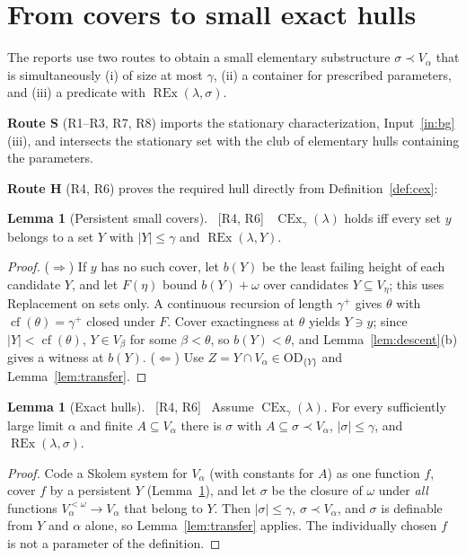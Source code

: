 \documentclass[11pt,letterpaper]{article}
\theoremstyle{definition}
\newtheorem{lemma}[definition]{Lemma}
\numberwithin{equation}{section}
\newcommand{\OD}{\mathrm{OD}}
\newcommand{\CEx}{\operatorname{CEx}}
\newcommand{\REx}{\operatorname{REx}}
\newcommand{\cf}{\operatorname{cf}}
\newcommand{\src}[1]{\unskip\ {\normalfont\small\sffamily\color{Olive}[#1]}\ }
\newcommand{\R}[1]{\textsf{R#1}}
\begin{document}
\section{From covers to small exact hulls}\label{sec:hulls}

The reports use two routes to obtain a small elementary substructure $\sigma\prec V_\alpha$ that is simultaneously (i) of size at most $\gamma$, (ii) a container for prescribed parameters, and (iii) a predicate with $\REx(\lambda,\sigma)$.

\textbf{Route S} (\R1--\R3, \R7, \R8) imports the stationary characterization, Input~\ref{in:bg}(iii), and intersects the stationary set with the club of elementary hulls containing the parameters.

\textbf{Route H} (\R4, \R6) proves the required hull directly from Definition~\ref{def:cex}:

\begin{lemma}[Persistent small covers]\label{lem:persist}\src{R4, R6}
$\CEx_\gamma(\lambda)$ holds iff every set $y$ belongs to a set $Y$ with $|Y|\le\gamma$ and $\REx(\lambda,Y)$.
\end{lemma}

\begin{proof}
($\Rightarrow$) If $y$ has no such cover, let $b(Y)$ be the least failing height of each candidate $Y$, and let $F(\eta)$ bound $b(Y)+\omega$ over candidates $Y\subseteq V_\eta$; this uses Replacement on sets only. A continuous recursion of length $\gamma^+$ gives $\theta$ with $\cf(\theta)=\gamma^+$ closed under $F$. Cover exactingness at $\theta$ yields $Y\ni y$; since $|Y|<\cf(\theta)$, $Y\in V_\beta$ for some $\beta<\theta$, so $b(Y)<\theta$, and Lemma~\ref{lem:descent}(b) gives a witness at $b(Y)$. ($\Leftarrow$) Use $Z=Y\cap V_\alpha\in\OD_{\{Y\}}$ and Lemma~\ref{lem:transfer}.
\end{proof}

\begin{lemma}[Exact hulls]\label{lem:hull}\src{R4, R6}
Assume $\CEx_\gamma(\lambda)$. For every sufficiently large limit $\alpha$ and finite $A\subseteq V_\alpha$ there is $\sigma$ with $A\subseteq\sigma\prec V_\alpha$, $|\sigma|\le\gamma$, and $\REx(\lambda,\sigma)$.
\end{lemma}

\begin{proof}
Code a Skolem system for $V_\alpha$ (with constants for $A$) as one function $f$, cover $f$ by a persistent $Y$ (Lemma~\ref{lem:persist}), and let $\sigma$ be the closure of $\omega$ under \emph{all} functions $V_\alpha^{<\omega}\to V_\alpha$ that belong to $Y$. Then $|\sigma|\le\gamma$, $\sigma\prec V_\alpha$, and $\sigma$ is definable from $Y$ and $\alpha$ alone, so Lemma~\ref{lem:transfer} applies. The individually chosen $f$ is not a parameter of the definition.
\end{proof}
\end{document}
